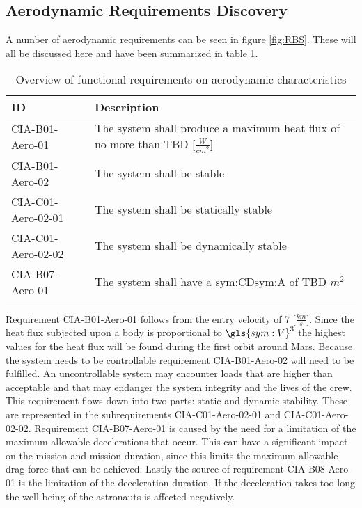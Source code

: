 \subsection{Aerodynamic Requirements Discovery} 
\label{sec:aero}
A number of aerodynamic requirements can be seen in figure \ref{fig:RBS}. These will all be discussed here and have been summarized in table \ref{tab:aeroreqs}. 


\begin{table}[h]
	\caption{Overview of functional requirements on aerodynamic characteristics}
	\label{tab:aeroreqs}
	\begin{tabular}{|p{}|p{}|}
		\hline
		ID & Description \\
		\hline \hline
		CIA-B01-Aero-01 & The system shall produce a maximum heat flux of no more than TBD [$\frac{W}{cm^{2}}$] \\ \hline
		CIA-B01-Aero-02 & The system shall be stable \\ \hline
		CIA-C01-Aero-02-01 & The system shall be statically stable \\ \hline
		CIA-C01-Aero-02-02 & The system shall be dynamically stable \\ \hline
		CIA-B07-Aero-01 & The system shall have a \gls{sym:CD}\gls{sym:A} of TBD $m^{2}$ \\ \hline
	\end{tabular}
\end{table}

Requirement CIA-B01-Aero-01 follows from the entry velocity of 7 [$\frac{km}{s}$]. Since the heat flux subjected upon a body is proportional to $\gls{sym:V}^{3}$ \cite{Tauber1986} the highest values for the heat flux will be found during the first orbit around Mars. 
Because the system needs to be controllable requirement CIA-B01-Aero-02 will need to be fulfilled. An uncontrollable system may encounter loads that are higher than acceptable and that may endanger the system integrity and the lives of the crew. This requirement flows down into two parts: static and dynamic stability. These are represented in the subrequirements CIA-C01-Aero-02-01 and CIA-C01-Aero-02-02.
Requirement CIA-B07-Aero-01 is caused by the need for a limitation of the maximum allowable decelerations that occur. This can have a significant impact on the mission and mission duration, since this limits the maximum allowable drag force that can be achieved.
Lastly the source of requirement CIA-B08-Aero-01 is the limitation of the deceleration duration. If the deceleration takes too long the well-being of the astronauts is affected negatively.